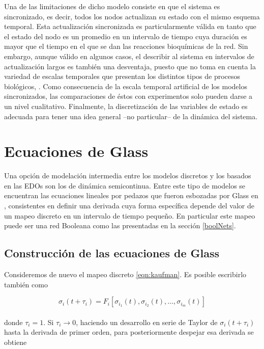 Una de las limitaciones de dicho modelo consiste en que el sistema es sincronizado, es decir, todos los nodos actualizan su estado con el mismo esquema temporal. Esta actualización sincronizada es particularmente válida en tanto que el estado del nodo es un promedio en un intervalo de tiempo cuya duración es mayor que el tiempo en el que se dan las reacciones bioquímicas de la red. Sin embargo, aunque válido en algunos casos, el describir al sistema en intervalos de actualización largos es también una desventaja, puesto que no toma en cuenta la variedad de escalas temporales que presentan los distintos tipos de procesos biológicos, \citeauthor{Reka3Nodos2010} \citep{Reka3Nodos2010}. Como consecuencia de la escala temporal artificial de los modelos sincronizados, las comparaciones de éstos con experimentos solo pueden darse a un nivel cualitativo. Finalmente, la discretización de las variables de estado es adecuada para tener una idea general --no particular-- de la dinámica del sistema. 

\section{Ecuaciones de Glass}

Una opción de modelación intermedia entre los modelos discretos y los basados en las \ac{EDOs} son los de dinámica semicontinua. Entre este tipo de modelos se encuentran las ecuaciones lineales por pedazos que fueron esbozadas por Glass en \citeauthor{Glass1973} \citep{Glass1973}, consistentes en definir una derivada cuya forma específica depende del valor de un mapeo discreto en un intervalo de tiempo pequeño. En particular este mapeo puede ser una red Booleana como las presentadas en la sección \ref{boolNets}.

\subsection{Construcción de las ecuaciones de Glass}

Consideremos de nuevo el mapeo discreto \ref{eqn:kaufman}. Es posible escribirlo también como

\begin{equation}
\sigma_i(t+\tau_i)=F_i[\sigma_{i_1}(t),\sigma_{i_2}(t),\ldots,\sigma_{i_m}(t)]
\end{equation}
\\
donde $\tau_i=1$. Si $\tau_i \rightarrow 0$, haciendo un desarrollo en serie de Taylor de $\sigma_i(t+\tau_i)$ hasta la derivada de primer orden, para posteriormente despejar esa derivada se obtiene

